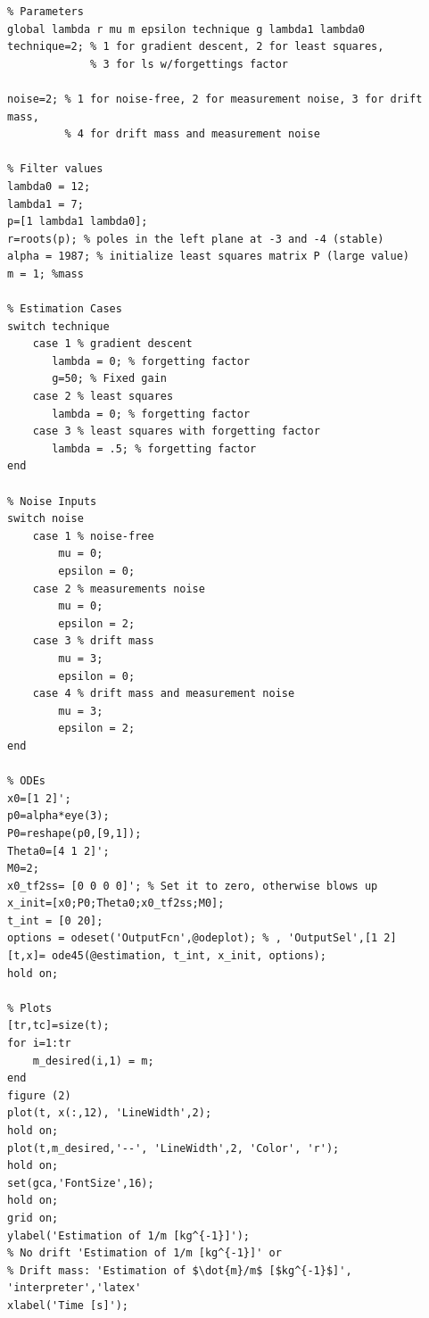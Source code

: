 \documentclass[12pt]{article}
\begin{document}
\begin{lstlisting}
% Parameters
global lambda r mu m epsilon technique g lambda1 lambda0
technique=2; % 1 for gradient descent, 2 for least squares,  
             % 3 for ls w/forgettings factor
             
noise=2; % 1 for noise-free, 2 for measurement noise, 3 for drift mass,
         % 4 for drift mass and measurement noise
         
% Filter values
lambda0 = 12; 
lambda1 = 7; 
p=[1 lambda1 lambda0];
r=roots(p); % poles in the left plane at -3 and -4 (stable)
alpha = 1987; % initialize least squares matrix P (large value)
m = 1; %mass

% Estimation Cases
switch technique
    case 1 % gradient descent
       lambda = 0; % forgetting factor 
       g=50; % Fixed gain
    case 2 % least squares
       lambda = 0; % forgetting factor 
    case 3 % least squares with forgetting factor
       lambda = .5; % forgetting factor
end

% Noise Inputs
switch noise
    case 1 % noise-free
        mu = 0; 
        epsilon = 0;
    case 2 % measurements noise
        mu = 0; 
        epsilon = 2;
    case 3 % drift mass
        mu = 3; 
        epsilon = 0;
    case 4 % drift mass and measurement noise
        mu = 3;
        epsilon = 2;
end

% ODEs 
x0=[1 2]';
p0=alpha*eye(3);
P0=reshape(p0,[9,1]);
Theta0=[4 1 2]';
M0=2;
x0_tf2ss= [0 0 0 0]'; % Set it to zero, otherwise blows up
x_init=[x0;P0;Theta0;x0_tf2ss;M0];
t_int = [0 20];
options = odeset('OutputFcn',@odeplot); % , 'OutputSel',[1 2] 
[t,x]= ode45(@estimation, t_int, x_init, options);
hold on;

% Plots
[tr,tc]=size(t);
for i=1:tr
    m_desired(i,1) = m;
end
figure (2)
plot(t, x(:,12), 'LineWidth',2);
hold on;
plot(t,m_desired,'--', 'LineWidth',2, 'Color', 'r');
hold on;
set(gca,'FontSize',16);
hold on;
grid on;
ylabel('Estimation of 1/m [kg^{-1}]');
% No drift 'Estimation of 1/m [kg^{-1}]' or 
% Drift mass: 'Estimation of $\dot{m}/m$ [$kg^{-1}$]', 'interpreter','latex'
xlabel('Time [s]');
\end{lstlisting}
\end{document}
